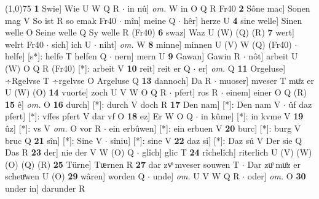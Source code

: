 \documentclass[8pt,a4paper,notitlepage]{article}
\begin{document}
\begin{table}[ht]
\begin{minipage}[t]{0.5\linewidth}
\line(1,0){75} \newline
\textbf{1} Swie] Wie U W Q R  $\cdot$ in nû] \textit{om.} W in O Q R Fr40 \textbf{2} Sône mac] Sonen mag V So ist R so emak Fr40  $\cdot$ mîn] meine Q  $\cdot$ hêr] herze U \textbf{4} sine welle] Sinen welle O Seine welle Q Sy welle R (Fr40) \textbf{6} swaz] Waz U (W) (Q) (R) \textbf{7} wert] welrt Fr40  $\cdot$ sich] ich U  $\cdot$ niht] \textit{om.} W \textbf{8} minne] minnen U (V) W (Q) (Fr40)  $\cdot$ helfe] [s*]: helfe T helfen Q  $\cdot$ nern] mern U \textbf{9} Gawan] Gawin R  $\cdot$ nôt] arbeit U (W) O Q R (Fr40) [*]: arbeit  V \textbf{10} reit] reit er Q  $\cdot$ er] \textit{om.} Q \textbf{11} Orgeluse] ÷Rgelvse T ÷rgelvse O Argeluse Q \textbf{13} dannoch] Da R  $\cdot$ muoser] mveser T muͦz er U (W) (O) \textbf{14} vuorte] zoch U V W O Q R  $\cdot$ pfert] ros R  $\cdot$ einem] einer O Q (R) \textbf{15} ê] \textit{om.} O \textbf{16} durch] [*]: durch V doch R \textbf{17} Den nam] [*]: Den nam V  $\cdot$ ûf daz pfert] [*]: vffes pfert V dar vf O \textbf{18} ez] Er W O Q  $\cdot$ in kûme] [*]: in kvme V \textbf{19} ûz] [*]: vs V \textit{om.} O vor R  $\cdot$ ein erbûwen] [*]: ein erbuen V \textbf{20} burc] [*]: burg V bruc Q \textbf{21} sîn] [*]: Sine V  $\cdot$ sîniu] [*]: sine V \textbf{22} daz si] [*]: Daz sú V Der sie Q Das R \textbf{23} der] nie der V W (O) Q  $\cdot$ glîch] glic T \textbf{24} rîchelîch] riterlich U (V) (W) (O) (Q) (R) \textbf{25} Türne] Tᵫrnen R \textbf{27} dar zvͦ mveser souwen T  $\cdot$ Dar zuͦ muͦz er scheuͦwen U (O) \textbf{29} wâren] worden Q  $\cdot$ unde] \textit{om.} U V W Q R  $\cdot$ oder] \textit{om.} O \textbf{30} under in] darunder R \newline
\end{minipage}
\end{table}
\end{document}
